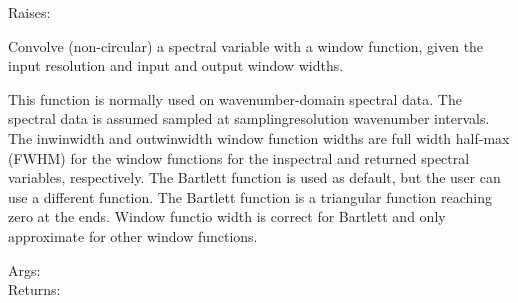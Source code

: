 \documentclass[a4paper,10pt,english]{sphinxmanual}
\begin{document}
\begin{fulllineitems}
\begin{description}
\item[{Raises:}] \leavevmode
{}

\end{description}

\end{fulllineitems}


\begin{fulllineitems}
\label{ryutils:pyradi.ryutils.convolve}
Convolve (non-circular) a spectral variable with a window function,
given the input resolution and input and output window widths.

This function is normally used on wavenumber-domain spectral data.  The spectral
data is assumed sampled at samplingresolution wavenumber intervals.
The inwinwidth and outwinwidth window function widths are full width half-max (FWHM)
for the window functions for the inspectral and returned spectral variables, respectively.
The Bartlett function is used as default, but the user can use a different function.
The Bartlett function is a triangular function reaching zero at the ends. Window functio
width is correct for Bartlett and only approximate for other window functions.
\begin{description}
\item[{Args:}] \leavevmode
{}

\item[{Returns:}] \leavevmode
{}


\end{description}
\end{fulllineitems}
\end{document}
